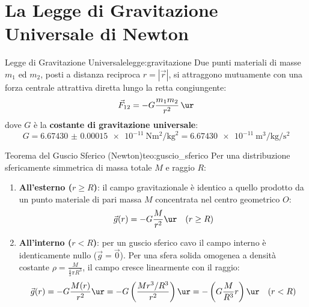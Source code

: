 \section{La Legge di Gravitazione Universale di Newton}
\label{sec:legge_gravitazione}

\begin{legge}{Legge di Gravitazione Universale}{legge:gravitazione}
Due punti materiali di masse $m_1$ ed $m_2$, posti a distanza reciproca $r = |\vec{r}|$, si attraggono mutuamente con una forza centrale attrattiva diretta lungo la retta congiungente:
\begin{equation}
    \vec{F}_{12} = -G\frac{m_1 m_2}{r^2}\,\ur
    \label{eq:gravitazione_newton}
\end{equation}
dove $G$ è la \textbf{costante di gravitazione universale}:
\begin{equation}
    G = \SI{6.67430(15)e-11}{\newton\metre\squared\per\kilogram\squared} = \SI{6.67430e-11}{\metre\cubed\per\kilogram\per\second\squared}
\end{equation}
\end{legge}

\begin{teorema}{Teorema del Guscio Sferico (Newton)}{teo:guscio_sferico}
Per una distribuzione sfericamente simmetrica di massa totale $M$ e raggio $R$:
\begin{enumerate}
    \item \textbf{All'esterno ($r \ge R$)}: il campo gravitazionale è identico a quello prodotto da un punto materiale di pari massa $M$ concentrata nel centro geometrico $O$:
    \begin{equation}
        \vec{g}(r) = -G\frac{M}{r^2}\ur \quad (r \ge R)
    \end{equation}
    \item \textbf{All'interno ($r < R$)}: per un guscio sferico cavo il campo interno è identicamente nullo ($\vec{g} = \vec{0}$). Per una sfera solida omogenea a densità costante $\rho = \frac{M}{\frac{4}{3}\pi R^3}$, il campo cresce linearmente con il raggio:
    \begin{equation}
        \vec{g}(r) = -G\frac{M(r)}{r^2}\ur = -G\left(\frac{M r^3/R^3}{r^2}\right)\ur = -\left(G\frac{M}{R^3} r\right)\ur \quad (r < R)
    \end{equation}
\end{enumerate}
\end{teorema}

